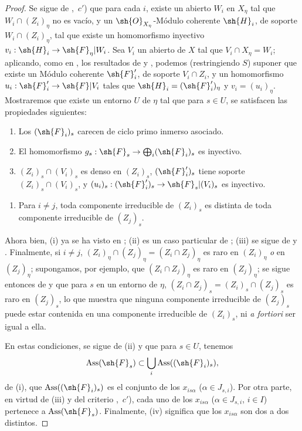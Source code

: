 \begin{proof}
\label{IV.9.8.3-proof}
Se sigue de ,~$c'$) que para cada $i$, existe un abierto $W_i$ en $X_\eta$ tal que $W_i\cap(Z_i)_\eta$ no es vacío, y un $\sh{O}_{X_\eta}$-Módulo coherente $\sh{H}_i$, de soporte $W_i\cap(Z_i)_\eta$, tal que existe un homomorfismo inyectivo $v_i:\sh{H}_i\to\sh{F}_\eta|W_i$.
Sea $V_i$ un abierto de $X$ tal que $V_i\cap X_\eta=W_i$; aplicando, como en , los resultados de  y , podemos (restringiendo $S$) suponer que existe un Módulo coherente $\sh{F}'_i$, de soporte $V_i\cap Z_i$, y un homomorfismo $u_i:\sh{F}'_i\to\sh{F}|V_i$ tales que $\sh{H}_i=(\sh{F}'_i)_\eta$ y $v_i=(u_i)_\eta$.
Mostraremos que existe un entorno $U$ de $\eta$ tal que para $s\in U$, se satisfacen las propiedades siguientes:
\begin{enumerate}[label=(\roman*)]
  \item Los $(\sh{F}_i)_s$ carecen de ciclo primo inmerso asociado.
  \item El homomorfismo $g_s:\sh{F}_s\to\bigoplus_i(\sh{F}_i)_s$ es inyectivo.
  \item $(Z_i)_s\cap(V_i)_s$ es denso en $(Z_i)_s$, $(\sh{F}'_i)_s$ tiene soporte $(Z_i)_s\cap(V_i)_s$, y $(u_i)_s:(\sh{F}'_i)_s\to\sh{F}_s|(V_i)_s$ es inyectivo.
\end{enumerate}

\begin{enumerate}[label=(\roman*)]
  \item[(iv)] Para $i\neq j$, toda componente irreducible de $(Z_i)_s$ es distinta de toda componente irreducible de $(Z_j)_s$.
\end{enumerate}

Ahora bien, (i) ya se ha visto en ; (ii) es un caso particular de ; (iii) se sigue de  y .
Finalmente, si $i\neq j$, $(Z_i)_\eta\cap(Z_j)_\eta=(Z_i\cap Z_j)_\eta$ es raro en $(Z_i)_\eta$ \emph{o} en $(Z_j)_\eta$; supongamos, por ejemplo, que $(Z_i\cap Z_j)_\eta$ es raro en $(Z_j)_\eta$; se sigue entonces de  y  que para $s$ en un entorno de $\eta$, $(Z_i\cap Z_j)_s=(Z_i)_s\cap(Z_j)_s$ es raro en $(Z_j)_s$, lo que muestra que ninguna componente irreducible de $(Z_j)_s$ puede estar contenida en una componente irreducible de $(Z_i)_s$, ni \emph{a fortiori} ser igual a ella.

En estas condiciones, se sigue de (ii) y  que para $s\in U$, tenemos
\[
  \operatorname{Ass}(\sh{F}_s)\subset\bigcup_i\operatorname{Ass}((\sh{F}_i)_s),
\]
de (i), que $\operatorname{Ass}((\sh{F}_i)_s)$ es el conjunto de los $x_{is\alpha}$ ($\alpha\in J_{s,i}$).
Por otra parte, en virtud de (iii) y del criterio ,~$c'$), cada uno de los $x_{is\alpha}$ ($\alpha\in J_{s,i}$, $i\in I$) pertenece a $\operatorname{Ass}(\sh{F}_s)$.
Finalmente, (iv) significa que los $x_{is\alpha}$ son dos a dos distintos.


\end{proof}
